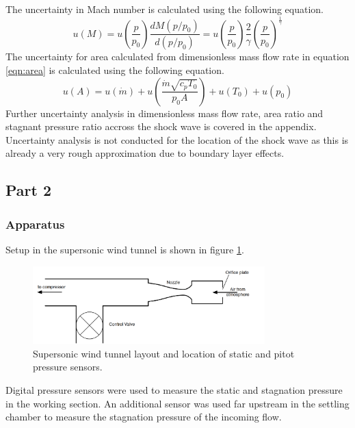 \documentclass{article}
\begin{document}
The uncertainty in Mach number is calculated using the following equation.
\begin{equation}
    u(M) = u\left( \frac{p}{p_0} \right) \frac{d M ( p/p_0 ) }{d (p/p_0)} = u\left(\frac{p}{p_0}\right) \frac{2}{\gamma}  \left( \frac{p}{p_0} \right) ^ {\frac{1}{\gamma}}
\end{equation}
The uncertainty for area calculated from dimensionless mass flow rate in equation \ref{eqn:area} is calculated using the following equation.
\begin{equation}
    u(A) = u(\dot{m}) + u(\frac{\dot{m}\sqrt{c_pT_0}}{p_0A}) + u(T_0) + u(p_0)
\end{equation}
Further uncertainty analysis in dimensionless mass flow rate, area ratio and stagnant pressure ratio accross the shock wave is covered in the appendix.
Uncertainty analysis is not conducted for the location of the shock wave as this is already a very rough approximation due to boundary layer effects.

\subsection{Part 2}

\subsubsection{Apparatus}

Setup in the supersonic wind tunnel is shown in figure \ref{fig:supersonic_tunnel}.

\begin{figure}[H]
    \centering
    \includegraphics[width=0.8\textwidth]{flow_layout.png}
    \caption{Supersonic wind tunnel layout and location of static and pitot pressure sensors.}
    \label{fig:supersonic_tunnel}
\end{figure}

Digital pressure sensors were used to measure the static and stagnation pressure in the working section.
An additional sensor was used far upstream in the settling chamber to measure the stagnation pressure of the incoming flow.
\end{document}
